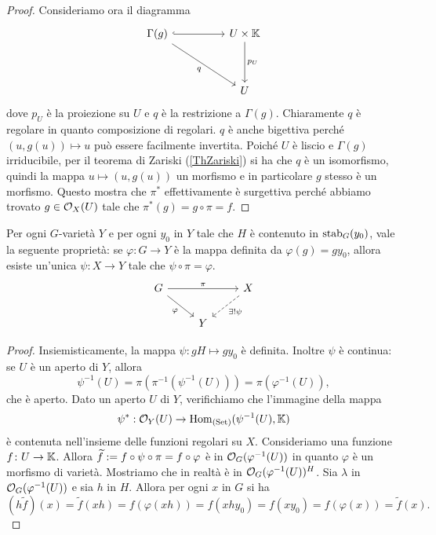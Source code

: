 \begin{proof}
Consideriamo ora il diagramma
\[\begin{tikzcd}
	{\Gamma(g)} && {U\times \K} \\
	\\
	&& U
	\arrow[hook, from=1-1, to=1-3]
	\arrow["q"', from=1-1, to=3-3]
	\arrow["{p_U}", from=1-3, to=3-3]
\end{tikzcd}\]
dove $p_U$ \`e la proiezione su $U$ e $q$ \`e la restrizione a $\Gamma(g)$. Chiaramente $q$ \`e regolare in quanto composizione di regolari. $q$ \`e anche bigettiva perch\'e $(u,g(u))\mapsto u$ pu\`o essere facilmente invertita. Poich\'e $U$ \`e liscio e $\Gamma(g)$ irriducibile, per il teorema di Zariski (\ref{ThZariski}) si ha che $q$ \`e un isomorfismo, quindi la mappa $u\mapsto (u,g(u))$ un morfismo e in particolare $g$ stesso \`e un morfismo. Questo mostra che $\pi^\ast$ effettivamente \`e surgettiva perch\'e abbiamo trovato $g\in \mathcal{O}_X(U)$ tale che $\pi^\ast(g)=g\circ \pi=f$.
\end{proof}


\begin{theorem}
    Per ogni $G$-varietà $Y$ e per ogni $y_0$ in $Y$ tale che $H$ è contenuto in $\operatorname{stab}_G(y_0)$, vale la seguente proprietà: se $\varphi\colon G \to Y$ è la mappa definita da $\varphi(g)=gy_0$, allora esiste un'unica $\psi\colon X \to Y$  tale che $\psi\circ\pi=\varphi$.
\[\begin{tikzcd}
	G && X \\
	& Y
	\arrow["\pi", from=1-1, to=1-3]
	\arrow["\varphi"', from=1-1, to=2-2]
	\arrow["{\exists !\psi}", dashed, from=1-3, to=2-2]
\end{tikzcd}\]
\end{theorem}

\begin{proof}
    Insiemisticamente, la mappa $\psi\colon gH \mapsto gy_0$ è definita. Inoltre $\psi$ è continua: se $U$ è un aperto di $Y$, allora \[\psi^{-1}(U)=\pi(\pi^{-1}(\psi^{-1}(U)))=\pi(\varphi^{-1}(U)),\] che è aperto. Dato un aperto $U$ di $Y$, verifichiamo che l'immagine della mappa 
    \[\psi^\ast:\mathcal{O}_Y(U)\to\operatorname{Hom}_{(\mathrm{Set})}(\psi^{-1}(U),\mathbb{K})\]
    è contenuta nell'insieme delle funzioni regolari su $X$. Consideriamo una funzione $f\colon U\to \mathbb{K}$. Allora $\widetilde{f}:= f\circ \psi\circ\pi =f \circ \varphi$ è in $\mathcal{O}_G(\varphi^{-1}(U))$ in quanto $\varphi$ è un morfismo di varietà. Mostriamo che in realtà è in $\mathcal{O}_G(\varphi^{-1}(U))^H$. Sia $\lambda$ in $\mathcal{O}_G(\varphi^{-1}(U))$ e sia $h$ in $H$. Allora per ogni $x$ in $G$ si ha \[(h\widetilde{f})(x)=\widetilde{f}(xh)=f(\varphi(xh))=f(xhy_0)=f(x y_0)=f(\varphi(x))=\widetilde{f}(x).\]
\end{proof}

